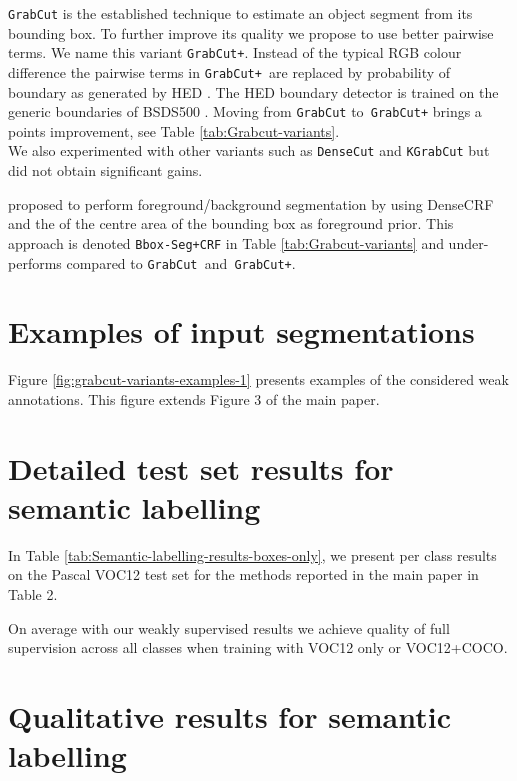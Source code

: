 \documentclass[10pt,english,british,twocolumn]{article}
\begin{document}
\texttt{GrabCut} \cite{Rother2004TogGrabcut} is the established technique
to estimate an object segment from its bounding box. To further improve
its quality we propose to use better pairwise terms. We name this
variant \texttt{GrabCut+}. Instead of the typical RGB colour difference
the pairwise terms in \texttt{GrabCut+ }are replaced by probability
of boundary as generated by HED \cite{Xie2015Iccv}. The HED boundary
detector is trained on the generic boundaries of BSDS500 \cite{ArbelaezMaireFowlkesMalikPAMI11}.
Moving from \texttt{GrabCut} to\texttt{ GrabCut+} brings a 
points improvement, see Table \ref{tab:Grabcut-variants}.\\
We also experimented with other variants such as \texttt{DenseCut}
\cite{Cheng2015CgfDenseCut} and \texttt{KGrabCut} \cite{Tang2015IccvSecretGrabCut}
but did not obtain significant gains.

\cite{Papandreou2015Iccv} proposed to perform foreground/background
segmentation by using DenseCRF and the  of the centre area
of the bounding box as foreground prior. This approach is denoted
\texttt{Bbox-Seg+CRF} in Table \ref{tab:Grabcut-variants} and under-performs
compared to \texttt{GrabCut }and\texttt{ GrabCut+}. 

\section{\label{sec:Examples-of-input}Examples of input segmentations}

Figure \ref{fig:grabcut-variants-examples-1} presents examples of
the considered weak annotations. This figure extends Figure 3 of the
main paper.

\section{\label{sec:Quantitative-results-for}Detailed test set results for
semantic labelling}

In Table \ref{tab:Semantic-labelling-results-boxes-only}, we present
per class results on the Pascal VOC12 test set for the methods reported
in the main paper in Table 2.

On average with our weakly supervised results we achieve 
quality of full supervision across all classes when training with
VOC12 only or VOC12+COCO.

\section{\label{sec:Qualitative-results-for}Qualitative results for semantic
labelling}
\end{document}
